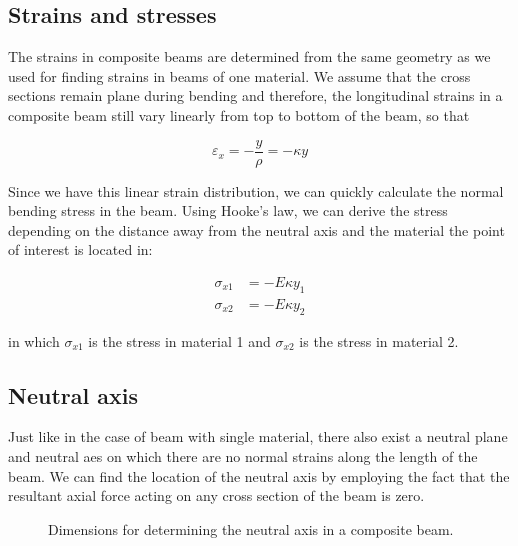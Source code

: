 \documentclass[
10pt,
a4paper,
openany,
svgnames,
]{book} %
\begin{document}
\subsection{Strains and stresses}

The strains in composite beams are determined from the same geometry as we used for finding strains in beams of one material. We assume that the cross sections remain plane during bending and therefore, the longitudinal strains in a composite beam still vary linearly from top to bottom of the beam, so that

\begin{equation}
  {\varepsilon _x} =  - \frac{y}{\rho } =  - \kappa y
\end{equation}

Since we have this linear strain distribution, we can quickly calculate the normal bending stress in the beam. Using Hooke’s law, we can derive the stress depending on the distance away from the neutral axis and the material the point of interest is located in:

\begin{align}
  {\sigma _{x1}} &=  - E\kappa {y_1}  \nonumber \\
  {\sigma _{x2}} &=  - E\kappa {y_2} 
\end{align}

in which $\sigma_{x1}$ is the stress in material 1 and $\sigma_{x2}$ is the stress in material 2.

\subsection{Neutral axis}

Just like in the case of beam with single material, there also exist a neutral plane and neutral aes on which there are no normal strains along the length of the beam. We can find the location of the neutral axis by employing the fact that the resultant axial force acting on any cross section of the beam is zero.

\begin{figure}[h]
  \centering
  \caption{Dimensions for determining the neutral axis in a composite beam.}
\end{figure}
\end{document}
